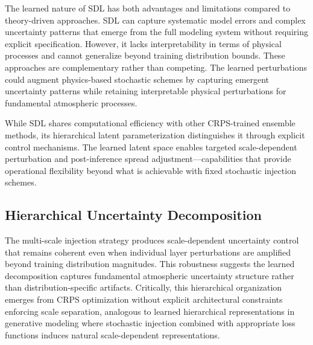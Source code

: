 \documentclass[11pt]{article}
\begin{document}
The learned nature of SDL has both advantages and limitations compared to theory-driven approaches. SDL can capture systematic model errors and complex uncertainty patterns that emerge from the full modeling system without requiring explicit specification. However, it lacks interpretability in terms of physical processes and cannot generalize beyond training distribution bounds. These approaches are complementary rather than competing. The learned perturbations could augment physics-based stochastic schemes by capturing emergent uncertainty patterns while retaining interpretable physical perturbations for fundamental atmospheric processes.

While SDL shares computational efficiency with other CRPS-trained ensemble methods, its hierarchical latent parameterization distinguishes it through explicit control mechanisms. The learned latent space enables targeted scale-dependent perturbation and post-inference spread adjustment—capabilities that provide operational flexibility beyond what is achievable with fixed stochastic injection schemes.


\subsection{Hierarchical Uncertainty Decomposition}

The multi-scale injection strategy produces scale-dependent uncertainty control that remains coherent even when individual layer perturbations are amplified beyond training distribution magnitudes. This robustness suggests the learned decomposition captures fundamental atmospheric uncertainty structure rather than distribution-specific artifacts. Critically, this hierarchical organization emerges from CRPS optimization without explicit architectural constraints enforcing scale separation, analogous to learned hierarchical representations in generative modeling \cite{karras2019style, karras2020analyzing} where stochastic injection combined with appropriate loss functions induces natural scale-dependent representations.
\end{document}
